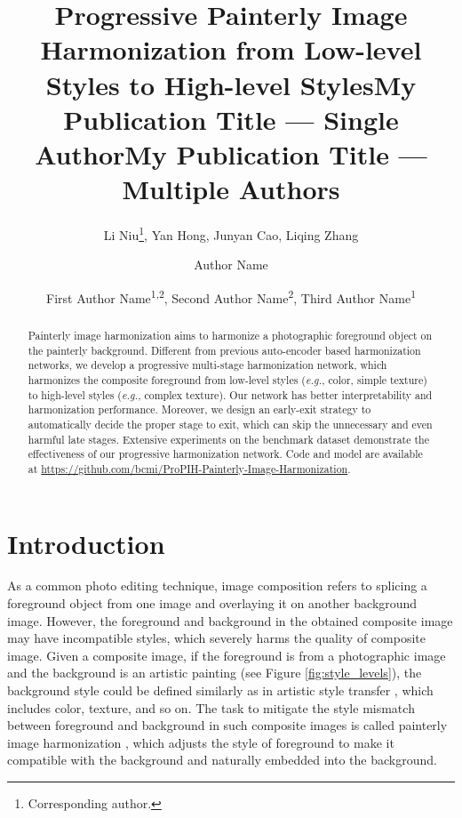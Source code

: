 \documentclass[letterpaper]{article} %
\title{Progressive Painterly Image Harmonization from Low-level Styles to High-level Styles}
\author{
    Li Niu\thanks{Corresponding author.},
    Yan Hong, 
    Junyan Cao, 
    Liqing Zhang 
    \\
}
\title{My Publication Title --- Single Author}
\author {
    Author Name
}
\title{My Publication Title --- Multiple Authors}
\author {
    First Author Name\textsuperscript{\rm 1,\rm 2},
    Second Author Name\textsuperscript{\rm 2},
    Third Author Name\textsuperscript{\rm 1}
}
\begin{document}
\maketitle

\begin{abstract}
Painterly image harmonization aims to harmonize a photographic foreground object on the painterly background. Different from previous auto-encoder based harmonization networks, we develop a progressive multi-stage harmonization network, which harmonizes the composite foreground from low-level styles (\emph{e.g.}, color, simple texture) to high-level styles (\emph{e.g.}, complex texture). Our network has better interpretability and harmonization performance. Moreover, we design an early-exit strategy to automatically decide the proper stage to exit, which can skip the unnecessary and even harmful late stages. Extensive experiments on the benchmark dataset demonstrate the effectiveness of our progressive harmonization network. Code and model are available at \url{https://github.com/bcmi/ProPIH-Painterly-Image-Harmonization}. 
\end{abstract}

\section{Introduction} \label{sec:intro}

As a common photo editing technique, image composition refers to splicing a foreground object from one image and overlaying it on another background image. However, the foreground and background in the obtained composite image may have incompatible styles, which severely harms the quality of composite image. 
Given a composite image, if the foreground is from a photographic image and the background is an artistic painting (see Figure \ref{fig:style_levels}), the background style could be defined similarly as in artistic style transfer \cite{gatys2016image,huang2017arbitrary,park2019arbitrary}, which includes color, texture, and so on. The task to mitigate the style mismatch between foreground and background in such composite images is 
called painterly image harmonization \cite{luan2018deep}, which adjusts the style of foreground to make it compatible with the background and naturally embedded into the background. 
\end{document}
